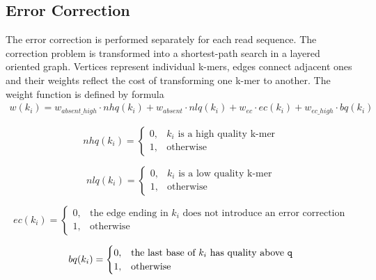 \subsection{Error Correction}
\label{subsec:fermi-error-correction}

The error correction is performed separately for each read sequence. The correction problem is transformed into a shortest-path search in a layered oriented graph. Vertices represent individual k-mers, edges connect adjacent ones and their weights reflect the cost of transforming one k-mer to another. The weight function is defined by formula
\begin{align*}
	w(k_i) = w_{absent\_high} \cdot nhq(k_i) + w_{absent} \cdot nlq(k_i) + w_{ec} \cdot ec(k_i) + w_{ec\_high} \cdot bq(k_i)
\end{align*}

\begin{equation*}
nhq(k_i) = 
	\begin{cases}
		0, & \text{$k_i$ is a high quality k-mer} \\
		1, & \text{otherwise}
	\end{cases}
\end{equation*}
	
\begin{equation*}
nlq(k_i) = 
	\begin{cases}
		0, & \text{$k_i$ is a low quality k-mer} \\
		1, & \text{otherwise}
	\end{cases}
\end{equation*}

\begin{equation*}
ec(k_i) = 
	\begin{cases}
		0, & \text{the edge ending in $k_i$ does not introduce an error correction} \\
		1, & \text{otherwise}
	\end{cases}
\end{equation*}

\begin{equation*}
bq(k_i) = 
	\begin{cases}
		0, & \text{the last base of $k_i$ has quality above \texttt{q}} \\
		1, & \text{otherwise}
	\end{cases}
\end{equation*}

